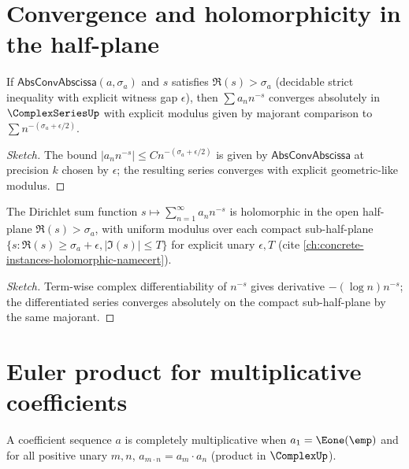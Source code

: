 \section{Convergence and holomorphicity in the half-plane}

\begin{theorem}
\label{thm:half-plane-convergence}
If \(\mathsf{AbsConvAbscissa}(a, \sigma_a)\) and \(s\) satisfies \(\Re(s) > \sigma_a\) (decidable strict inequality with explicit witness gap \(\epsilon\)), then \(\sum a_n n^{-s}\) converges absolutely in \(\ComplexSeriesUp\) with explicit modulus given by majorant comparison to \(\sum n^{-(\sigma_a + \epsilon/2)}\).
\end{theorem}
\begin{proof}[Sketch]
The bound \(|a_n n^{-s}| \leq C n^{-(\sigma_a + \epsilon/2)}\) is given by \(\mathsf{AbsConvAbscissa}\) at precision \(k\) chosen by \(\epsilon\); the resulting series converges with explicit geometric-like modulus.
\end{proof}

\begin{theorem}
\label{thm:half-plane-holomorphic}
The Dirichlet sum function \(s \mapsto \sum_{n=1}^{\infty} a_n n^{-s}\) is holomorphic in the open half-plane \(\Re(s) > \sigma_a\), with uniform modulus over each compact sub-half-plane \(\{s : \Re(s) \geq \sigma_a + \epsilon, |\Im(s)| \leq T\}\) for explicit unary \(\epsilon, T\) (cite \autoref{ch:concrete-instances-holomorphic-namecert}).
\end{theorem}
\begin{proof}[Sketch]
Term-wise complex differentiability of \(n^{-s}\) gives derivative \(-(\log n) n^{-s}\); the differentiated series converges absolutely on the compact sub-half-plane by the same majorant.
\end{proof}

\section{Euler product for multiplicative coefficients}

\begin{definition}
\label{def:completely-multiplicative}
A coefficient sequence \(a\) is completely multiplicative when \(a_1 = \Eone(\emp)\) and for all positive unary \(m, n\), \(a_{m \cdot n} = a_m \cdot a_n\) (product in \(\ComplexUp\)).
\end{definition}

